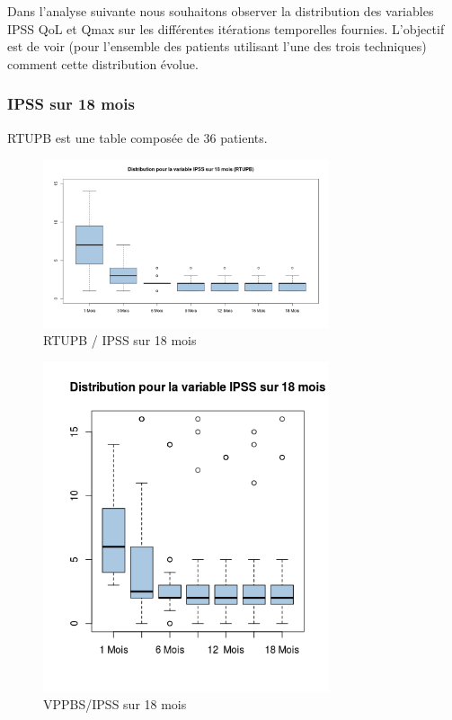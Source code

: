 %
%

Dans l’analyse suivante nous souhaitons observer la distribution des variables IPSS QoL et Qmax sur les différentes itérations temporelles fournies. L’objectif est de voir (pour l’ensemble des patients utilisant l’une des trois techniques) comment cette distribution évolue. 

\subsubsection{IPSS sur 18 mois }

RTUPB est une table composée de 36 patients. 
	
\begin{figure}[H]
\centering
\includegraphics[width=0.75\textwidth]{../Fig/RTUPB/rtupb-boxplot-post-ipss}
\caption{RTUPB / IPSS sur 18 mois}
\end{figure}	
	
\begin{figure}[H]
\centering
\includegraphics[width=0.75\textwidth]{../Fig/VPPBS/vppbs-boxplot-post-ipss}
\caption{VPPBS/IPSS sur 18 mois}
\end{figure}


